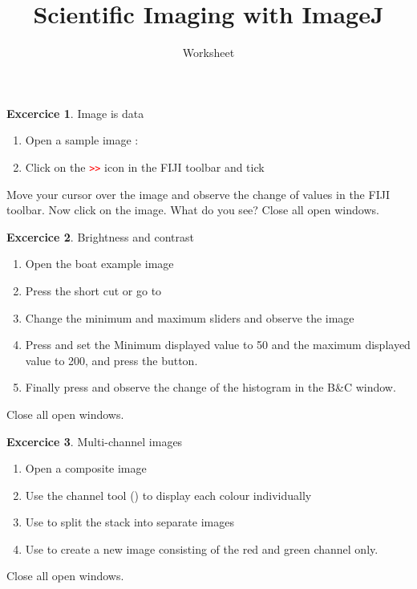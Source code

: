 \documentclass[xcolor=table]{scrartcl}
\title{Scientific Imaging with ImageJ}
\subtitle{Worksheet}
\theoremstyle{definition}
\newtheorem{exercice}{Excercice}
\begin{document}
\maketitle

\begin{exercice} Image is data
  \begin{enumerate}
  \item Open a sample image : 
  \item Click on the \textcolor{red}{\texttt{>>}} icon in the FIJI toolbar and tick
  \end{enumerate}
  Move your cursor over the image and observe the change of values in the FIJI toolbar. Now click on the image. What do you see?
  Close all open windows.
\end{exercice}

\begin{exercice} Brightness and contrast
  \begin{enumerate}
  \item Open the boat example image 
  \item Press the short cut  or go to 
  \item Change the minimum and maximum sliders and observe the image
  \item Press  and set the Minimum displayed value to 50
    and the maximum displayed value to 200, and press the  button.
  \item Finally press  and observe the change of the
    histogram in the B\&C window.
  \end{enumerate}
  Close all open windows. 
\end{exercice}

\begin{exercice} Multi-channel images
  \begin{enumerate}
  \item Open a composite image 
  \item Use the channel tool () to display each colour individually
  \item Use  to split the stack into separate images
  \item Use  to create a new image consisting of the red and green channel only. 
  \end{enumerate}
Close all open windows. 

\end{exercice}
\end{document}
